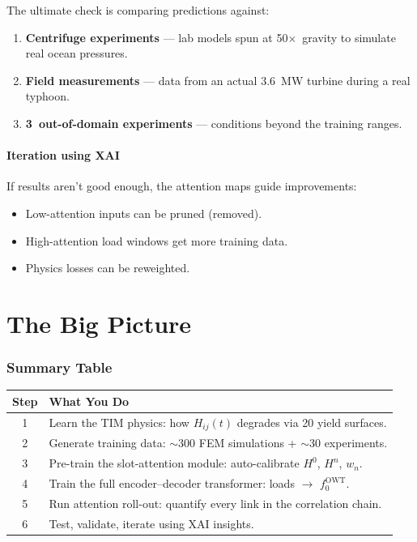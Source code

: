 \documentclass[11pt,a4paper]{article}
\begin{document}
The ultimate check is comparing predictions against:
\begin{enumerate}[noitemsep]
  \item \textbf{Centrifuge experiments} --- lab models spun at
        50$\times$~gravity to simulate real ocean pressures.
  \item \textbf{Field measurements} --- data from an actual 3.6~MW turbine
        during a real typhoon.
  \item \textbf{3~out-of-domain experiments} --- conditions beyond the
        training ranges.
\end{enumerate}

\subsection{Iteration using XAI}

If results aren't good enough, the attention maps guide improvements:
\begin{itemize}[noitemsep]
  \item Low-attention inputs can be pruned (removed).
  \item High-attention load windows get more training data.
  \item Physics losses can be reweighted.
\end{itemize}


\newpage
\part{The Big Picture}

\section{Summary Table}

\begin{center}
\begin{tabular}{cp{10cm}}
\toprule
\textbf{Step} & \textbf{What You Do} \\
\midrule
1 & Learn the TIM physics: how $H_{ij}(t)$ degrades via 20 yield surfaces. \\
2 & Generate training data: $\sim$300 FEM simulations + $\sim$30 experiments. \\
3 & Pre-train the slot-attention module: auto-calibrate $H^0$, $H^n$, $w_n$. \\
4 & Train the full encoder--decoder transformer: loads $\to$ $f_0^{\text{OWT}}$. \\
5 & Run attention roll-out: quantify every link in the correlation chain. \\
6 & Test, validate, iterate using XAI insights. \\
\bottomrule
\end{tabular}
\end{center}
\end{document}
